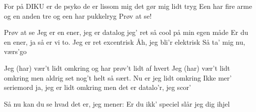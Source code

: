 \documentclass[a4paper,11pt]{article}
\begin{document}
\begin{song}
      For på DIKU er de psyko
      de er lissom mig
      det gør mig lidt tryg
      Een har fire arme og en anden tre
      og een har pukkelryg
      Prøv at se!

     Prøv at se
     Jeg er en ener, jeg er datalog
      jeg' ret så cool på min egen måde
      Er du en ener, ja så er vi to.
      Jeg er ret excentrisk
     Åh, jeg bli’r elektrisk
     Så ta’ mig nu, værs’go

      Jeg (har) vær’t lidt omkring
      og har prøv’t lidt af hvert
      Jeg (har) vær’t lidt omkring
      men aldrig set nog’t helt så sært.
      Nu er jeg lidt omkring
      Ikke mer’ seriemord
      ja, jeg er lidt omkring
      men det er datalo’r, jeg scor’




      Så nu kan du se
      hvad det er, jeg mener:
      Er du ikk’ speciel
      slår jeg dig ihjel

  \end{song}
\end{document}
